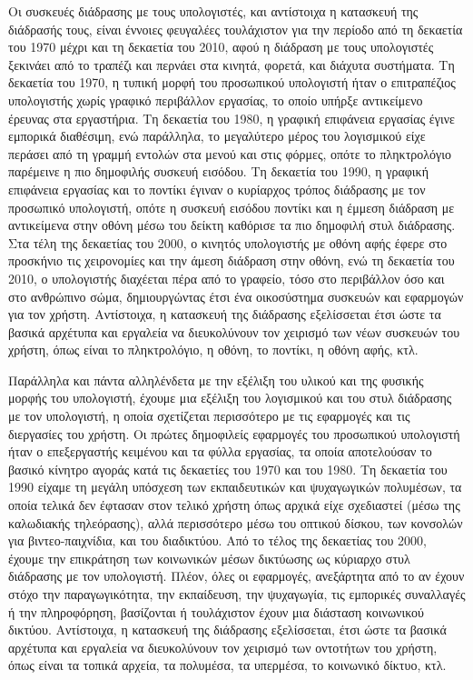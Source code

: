 \documentclass[
]{article}
\begin{document}
Οι συσκευές διάδρασης με τους υπολογιστές, και αντίστοιχα η κατασκευή
της διάδρασής τους, είναι έννοιες φευγαλέες τουλάχιστον για την περίοδο
από τη δεκαετία του 1970 μέχρι και τη δεκαετία του 2010, αφού η διάδραση
με τους υπολογιστές ξεκινάει από το τραπέζι και περνάει στα κινητά,
φορετά, και διάχυτα συστήματα. Tη δεκαετία του 1970, η τυπική μορφή του
προσωπικού υπολογιστή ήταν ο επιτραπέζιος υπολογιστής χωρίς γραφικό
περιβάλλον εργασίας, το οποίο υπήρξε αντικείμενο έρευνας στα εργαστήρια.
Τη δεκαετία του 1980, η γραφική επιφάνεια εργασίας έγινε εμπορικά
διαθέσιμη, ενώ παράλληλα, το μεγαλύτερο μέρος του λογισμικού είχε
περάσει από τη γραμμή εντολών στα μενού και στις φόρμες, οπότε το
πληκτρολόγιο παρέμεινε η πιο δημοφιλής συσκευή εισόδου. Τη δεκαετία του
1990, η γραφική επιφάνεια εργασίας και το ποντίκι έγιναν ο κυρίαρχος
τρόπος διάδρασης με τον προσωπικό υπολογιστή, οπότε η συσκευή εισόδου
ποντίκι και η έμμεση διάδραση με αντικείμενα στην οθόνη μέσω του δείκτη
καθόρισε τα πιο δημοφιλή στυλ διάδρασης. Στα τέλη της δεκαετίας του
2000, ο κινητός υπολογιστής με οθόνη αφής έφερε στο προσκήνιο τις
χειρονομίες και την άμεση διάδραση στην οθόνη, ενώ τη δεκαετία του 2010,
ο υπολογιστής διαχέεται πέρα από το γραφείο, τόσο στο περιβάλλον όσο και
στο ανθρώπινο σώμα, δημιουργώντας έτσι ένα οικοσύστημα συσκευών και
εφαρμογών για τον χρήστη. Αντίστοιχα, η κατασκευή της διάδρασης
εξελίσσεται έτσι ώστε τα βασικά αρχέτυπα και εργαλεία να διευκολύνουν
τον χειρισμό των νέων συσκευών του χρήστη, όπως είναι το πληκτρολόγιο, η
οθόνη, το ποντίκι, η οθόνη αφής, κτλ.

Παράλληλα και πάντα αλληλένδετα με την εξέλιξη του υλικού και της
φυσικής μορφής του υπολογιστή, έχουμε μια εξέλιξη του λογισμικού και του
στυλ διάδρασης με τον υπολογιστή, η οποία σχετίζεται περισσότερο με τις
εφαρμογές και τις διεργασίες του χρήστη. Οι πρώτες δημοφιλείς εφαρμογές
του προσωπικού υπολογιστή ήταν ο επεξεργαστής κειμένου και τα φύλλα
εργασίας, τα οποία αποτελούσαν το βασικό κίνητρο αγοράς κατά τις
δεκαετίες του 1970 και του 1980. Τη δεκαετία του 1990 είχαμε τη μεγάλη
υπόσχεση των εκπαιδευτικών και ψυχαγωγικών πολυμέσων, τα οποία τελικά
δεν έφτασαν στον τελικό χρήστη όπως αρχικά είχε σχεδιαστεί (μέσω της
καλωδιακής τηλεόρασης), αλλά περισσότερο μέσω του οπτικού δίσκου, των
κονσολών για βιντεο-παιχνίδια, και του διαδικτύου. Από το τέλος της
δεκαετίας του 2000, έχουμε την επικράτηση των κοινωνικών μέσων δικτύωσης
ως κύριαρχο στυλ διάδρασης με τον υπολογιστή. Πλέον, όλες οι εφαρμογές,
ανεξάρτητα από το αν έχουν στόχο την παραγωγικότητα, την εκπαίδευση, την
ψυχαγωγία, τις εμπορικές συναλλαγές ή την πληροφόρηση, βασίζονται ή
τουλάχιστον έχουν μια διάσταση κοινωνικού δικτύου. Αντίστοιχα, η
κατασκευή της διάδρασης εξελίσσεται, έτσι ώστε τα βασικά αρχέτυπα και
εργαλεία να διευκολύνουν τον χειρισμό των οντοτήτων του χρήστη, όπως
είναι τα τοπικά αρχεία, τα πολυμέσα, τα υπερμέσα, το κοινωνικό δίκτυο,
κτλ.
\end{document}
